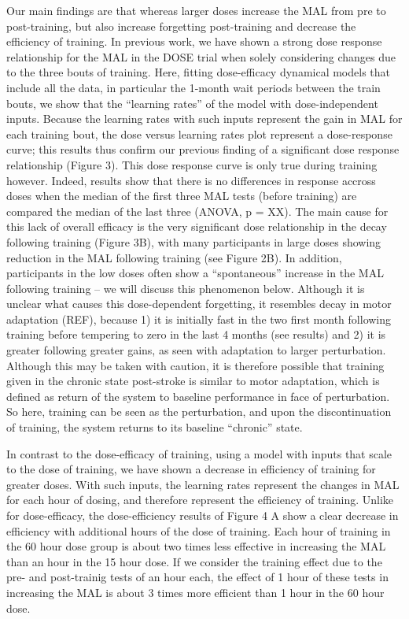 Our main findings are that whereas larger doses increase the MAL from pre to post-training, but also increase forgetting post-training and decrease the efficiency of training. 
In previous work, we have shown a strong dose response relationship for the MAL in the DOSE trial when solely considering changes due to the three bouts of training. 
Here, fitting dose-efficacy dynamical models that include all the data, in particular the 1-month wait periods between the train bouts, we show that the “learning rates” of the model with dose-independent inputs. 
Because the learning rates with such inputs represent the gain in MAL for each training bout, the dose versus learning rates plot represent a dose-response curve; this results thus confirm our previous finding of a significant dose response relationship (Figure 3). 
This dose response curve is only true during training however. 
Indeed, results show that there is no differences in response accross doses when the median of the first three MAL tests (before training) are compared the median of the last three (ANOVA, p = XX). 
The main cause for this lack of overall efficacy is the very significant dose relationship in the decay following training (Figure 3B), with many participants in large doses showing reduction in the MAL following training (see Figure 2B). 
In addition, participants in the low doses often show a “spontaneous” increase in the MAL following training – we will discuss this phenomenon below. 
Although it is unclear  what causes this dose-dependent forgetting, it resembles decay in motor adaptation (REF), because 1) it is initially fast in the two first month following training before tempering to zero in the last 4 months (see results) and 2) it is greater following greater gains, as seen with adaptation to larger perturbation. 
Although this may be taken with caution, it is therefore possible that training given in the chronic state post-stroke is similar to motor adaptation, which is defined as return of the system to baseline performance in face of perturbation. 
So here, training can be seen as the perturbation, and upon the discontinuation of training, the system returns to its baseline “chronic” state. 

In contrast to the dose-efficacy of training, using a model with inputs that scale to the dose of training, we have shown a decrease in efficiency of training for greater doses. 
With such inputs, the learning rates represent the changes in MAL for each hour of dosing, and therefore represent the efficiency of training. 
Unlike for dose-efficacy, the dose-efficiency results of Figure 4 A show a clear decrease in efficiency with additional hours of the dose of training. 
Each hour of training in the 60 hour dose group is about two times less effective in increasing the MAL than an hour in the 15 hour dose. 
If we consider the training effect due to the pre- and post-trainig tests of an hour each, the effect of 1 hour of these tests in increasing the MAL is about 3 times more efficient than 1 hour in the 60 hour dose. 

